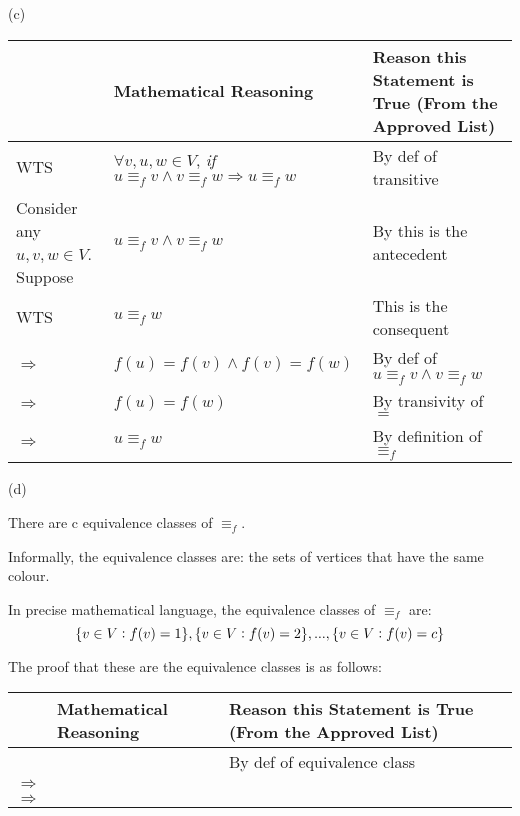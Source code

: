 \documentclass{article}
\begin{document}
(c)\vspace{5pt}

\begin{adjustwidth}{-1.5cm}{}
	\begin{tabular}{|p{1.5cm}|p{6.6cm}|p{5.5cm}|}
		\hline
        & \textbf{Mathematical Reasoning} & \textbf{Reason this Statement is True (From the Approved List)} \\
        \hline
		\vspace{1pt}
		WTS & $\forall v,u,w\in V$, \textit{if} $u\equiv_f v\land v\equiv_f w\Rightarrow u\equiv_f w$ & By def of transitive \\
		\hline
		Consider any $u,v,w\in V$. Suppose & $u\equiv_f v\land v\equiv_f w$ & By this is the antecedent \\
		\hline
		WTS & $u\equiv_f w$ & This is the consequent \\
		\hline
		$\Rightarrow$ & $f(u)=f(v)\land f(v)=f(w)$ & By def of $u\equiv_f v\land v\equiv_f w$ \\
		\hline
		$\Rightarrow$ & $f(u)=f(w)$ & By transivity of $=$ \\
		\hline
		$\Rightarrow$ & $u\equiv_f w$ & By definition of $\equiv_f$ \\
		\hline
	\end{tabular}
\end{adjustwidth}
\vspace{15pt}

(d) 

\hspace{0.5cm} There are c equivalence classes of $\equiv_f$. 
\vspace{2pt}

\hspace{0.5cm} Informally, the equivalence classes are: the sets of vertices that have the same colour.
\vspace{2pt}

\hspace{0.5cm} In precise mathematical language, the equivalence classes of $\equiv_f$ are: 
\[
	\{v\in V\vcentcolon f(v)=1\}, \{v\in V\vcentcolon f(v)=2\},...,\{v\in V\vcentcolon f(v)=c\}
\]

\vspace{5pt}

The proof that these are the equivalence classes is as follows:\vspace{5pt}

\begin{adjustwidth}{-1.5cm}{} 
	\begin{tabular}{|p{1.5cm}|p{6.6cm}|p{5.5cm}|}
		\hline
		& \textbf{Mathematical Reasoning} & \textbf{Reason this Statement is True (From the Approved List)} \\
		\hline
		 &  & By def of equivalence class \\
		\hline
		$\Rightarrow$ &  &  \\
		\hline
		$\Rightarrow$ &  &  \\
		\hline
	\end{tabular}
\end{adjustwidth}
\end{document}
